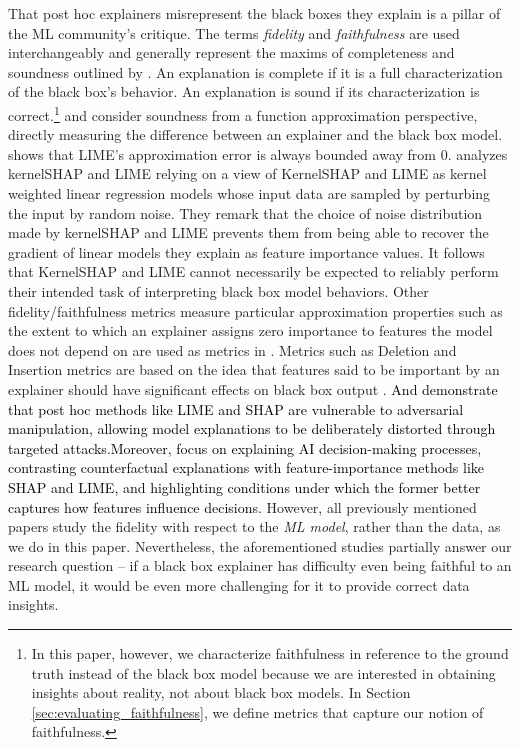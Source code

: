 \documentclass[mnsc,blindrev]{informs3}
\begin{document}
    
        That post hoc explainers misrepresent the black boxes they explain is a pillar of the ML community's critique. The terms \emph{fidelity} and \emph{faithfulness} are used interchangeably and generally represent the maxims of completeness and soundness outlined by \cite{zhou21evaluating}. An explanation is complete if it is a full characterization of the black box's behavior. An explanation is sound if its characterization is correct.\footnote{In this paper, however, we characterize faithfulness in reference to the ground truth instead of the black box model because we are interested in obtaining insights about reality, not about black box models. In Section \ref{sec:evaluating_faithfulness}, we define metrics that capture our notion of faithfulness.} 
    \cite{garreau2020looking} and \cite{han22which} consider soundness from a function approximation perspective, directly measuring the difference between an explainer  and the black box model. \cite{garreau2020looking} shows that LIME's approximation error is always bounded away from 0. \cite{han22which} analyzes kernelSHAP and LIME relying on a view of KernelSHAP and LIME as kernel weighted linear regression models whose input data are sampled by perturbing the input by random noise. They remark that the choice of noise distribution made by kernelSHAP and LIME prevents them from being able to recover the gradient of linear models they explain as feature importance values. It follows that KernelSHAP and LIME cannot necessarily be expected to reliably perform their intended task of interpreting black box model behaviors. 
Other fidelity/faithfulness metrics measure particular approximation properties such as the extent to which an explainer assigns zero importance to features the model does not depend on are used as metrics in \cite{nguyen2020quantitative}. Metrics such as Deletion and Insertion metrics are based on the idea that features said to be important by an explainer should have significant effects on black box output \citep{deyoung20eraser,nguyen2020quantitative,alvarez18robustness,luss2021leveraging}. \textcolor{black}{And \citet{slack19fooling} demonstrate that post hoc methods like LIME and SHAP are vulnerable to adversarial manipulation, allowing model explanations to be deliberately distorted through targeted attacks.Moreover, \citet{fernandez20explaining} focus on explaining AI decision-making processes, contrasting counterfactual explanations with feature-importance methods like SHAP and LIME, and highlighting conditions under which the former better captures how features influence decisions.} However, all previously mentioned papers study the fidelity with respect to the \textit{ML model}, rather than the data, as we do in this paper. Nevertheless, the aforementioned studies partially answer our research question -- if a black box explainer has difficulty even being faithful to an ML model, it would be even more challenging for it to provide correct data insights.
\end{document}
